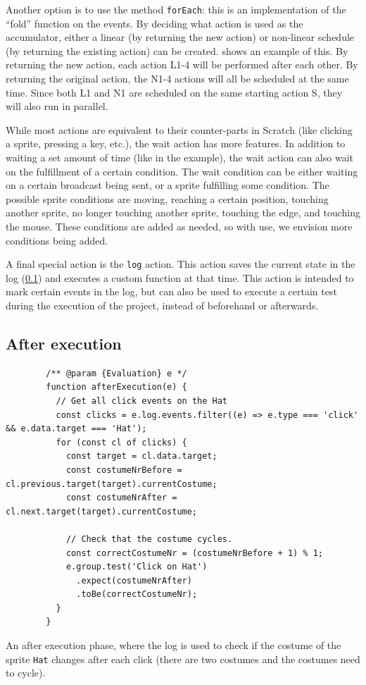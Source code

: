\documentclass[../main]{subfiles}
\begin{document}
Another option is to use the method \texttt{forEach}: this is an implementation of the ``fold'' function on the events.
By deciding what action is used as the accumulator, either a linear (by returning the new action) or non-linear schedule (by returning the existing action) can be created.
 shows an example of this.
By returning the new action, each action L1-4 will be performed after each other.
By returning the original action, the N1-4 actions will all be scheduled at the same time.
Since both L1 and N1 are scheduled on the same starting action S, they will also run in parallel.

While most actions are equivalent to their counter-parts in Scratch (like clicking a sprite, pressing a key, etc.), the wait action has more features.
In addition to waiting a set amount of time (like in the example), the wait action can also wait on the fulfillment of a certain condition.
The wait condition can be either waiting on a certain broadcast being sent, or a sprite fulfilling some condition.
The possible sprite conditions are moving, reaching a certain position, touching another sprite, no longer touching another sprite, touching the edge, and touching the mouse.
These conditions are added as needed, so with use, we envision more conditions being added.

A final special action is the \texttt{log} action.
This action saves the current state in the log (\cref{subsec:after-execution}) and executes a custom function at that time.
This action is intended to mark certain events in the log, but can also be used to execute a certain test during the execution of the project, instead of beforehand or afterwards.

\subsection{After execution}\label{subsec:after-execution}

\begin{listing}
    \begin{verbatim}
        /** @param {Evaluation} e */
        function afterExecution(e) {
          // Get all click events on the Hat
          const clicks = e.log.events.filter((e) => e.type === 'click' && e.data.target === 'Hat');
          for (const cl of clicks) {
            const target = cl.data.target;
            const costumeNrBefore = cl.previous.target(target).currentCostume;
            const costumeNrAfter = cl.next.target(target).currentCostume;

            // Check that the costume cycles.
            const correctCostumeNr = (costumeNrBefore + 1) % 1;
            e.group.test('Click on Hat')
              .expect(costumeNrAfter)
              .toBe(correctCostumeNr);
          }
        }
    \end{verbatim}
    \caption{An after execution phase, where the log is used to check if the costume of the sprite \texttt{Hat} changes after each click (there are two costumes and the costumes need to cycle).}
    \label{lst:itch-hat-costum-change}
\end{listing}
\end{document}
